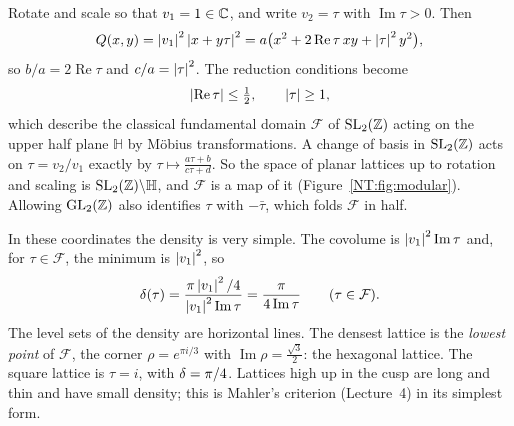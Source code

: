 Rotate and scale so that $v_1=1\in\mathbb{C}$, and write $v_2=\tau$ with $\operatorname{Im}\tau>0$. Then
\[
  Q(x,y)=\left\lvert v_1 \right\rvert^2\left\lvert x+y\tau \right\rvert^2=a\big(x^2+2\operatorname{Re}\tau\,xy+\left\lvert \tau \right\rvert^2y^2\big),
\]
so $b/a=2\operatorname{Re}\tau$ and $c/a=\left\lvert \tau \right\rvert^2$. The reduction conditions become
\[
  \left\lvert \operatorname{Re}\tau \right\rvert\le\tfrac12,\qquad \left\lvert \tau \right\rvert\ge1 ,
\]
which describe the classical fundamental domain $\mathcal F$ of $\mathrm{SL}_2(\mathbb{Z})$ acting on the upper half
plane $\mathbb H$ by M\"obius transformations. A change of basis in $\mathrm{SL}_2(\mathbb{Z})$ acts on $\tau=v_2/v_1$
exactly by $\tau\mapsto\frac{a\tau+b}{c\tau+d}$. So the space of planar lattices up to rotation and
scaling is $\mathrm{SL}_2(\mathbb{Z})\backslash\mathbb H$, and $\mathcal F$ is a map of it (Figure~\ref{NT:fig:modular}).
Allowing $\mathrm{GL}_2(\mathbb{Z})$ also identifies $\tau$ with $-\bar\tau$, which folds $\mathcal F$ in half.

In these coordinates the density is very simple. The covolume is $\left\lvert v_1 \right\rvert^2\operatorname{Im}\tau$ and,
for $\tau\in\mathcal F$, the minimum is $\left\lvert v_1 \right\rvert^2$, so
\[
  \delta(\tau)=\frac{\pi\left\lvert v_1 \right\rvert^2/4}{\left\lvert v_1 \right\rvert^2\operatorname{Im}\tau}=\frac{\pi}{4\operatorname{Im}\tau}
  \qquad(\tau\in\mathcal F).
\]
The level sets of the density are horizontal lines. The densest lattice is the \emph{lowest point} of
$\mathcal F$, the corner $\rho=e^{\pi i/3}$ with $\operatorname{Im}\rho=\frac{\sqrt3}{2}$: the hexagonal
lattice. The square lattice is $\tau=i$, with $\delta=\pi/4$. Lattices high up in the cusp are long and
thin and have small density; this is Mahler's criterion (Lecture~4) in its simplest form.

